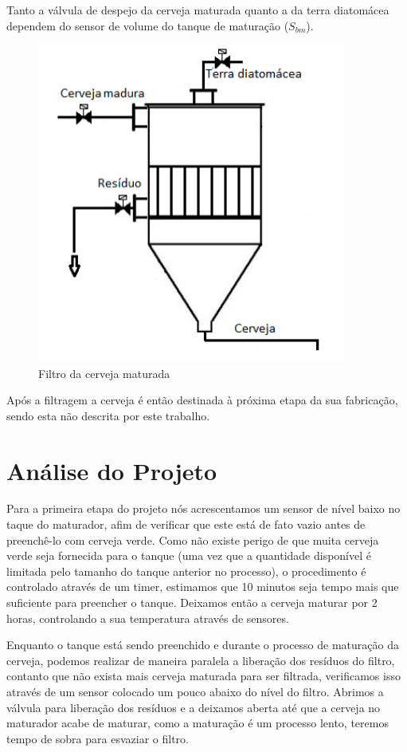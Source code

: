 \documentclass[12pt]{article}
\begin{document}
	
	Tanto a válvula de despejo da cerveja maturada quanto a da terra diatomácea dependem do sensor de volume do tanque de maturação ($S_{bm}$).
	
	\begin{figure}[H]
		\centering
		\includegraphics [width=4in]{filtro.png}
		\caption {Filtro da cerveja maturada}
		\label{fig:filtro}
	\end{figure}
	
	Após a filtragem a cerveja é então destinada à próxima etapa da sua fabricação, sendo esta não descrita por este trabalho.
	
	\section {Análise do Projeto}
	\label{sec:analise}
	Para a primeira etapa do projeto nós acrescentamos um sensor de nível baixo no taque do maturador, afim de verificar que este está de fato vazio antes de preenchê-lo com cerveja verde. Como não existe perigo de que muita cerveja verde seja fornecida para o tanque (uma vez que a quantidade disponível é limitada pelo tamanho do tanque anterior no processo), o procedimento é controlado através de um timer, estimamos que 10 minutos seja tempo mais que suficiente para preencher o tanque. Deixamos então a cerveja maturar por 2 horas, controlando a sua temperatura através de sensores.
	
	Enquanto o  tanque está sendo preenchido e durante o processo de maturação da cerveja, podemos realizar de maneira paralela a liberação dos resíduos do filtro, contanto que não exista mais cerveja maturada para ser filtrada, verificamos isso através de um sensor colocado um pouco abaixo do nível do filtro. Abrimos a válvula para liberação dos resíduos e a deixamos aberta até que a cerveja no maturador acabe de maturar, como a maturação é um processo lento, teremos tempo de sobra para esvaziar o filtro.
	
\end{document}
